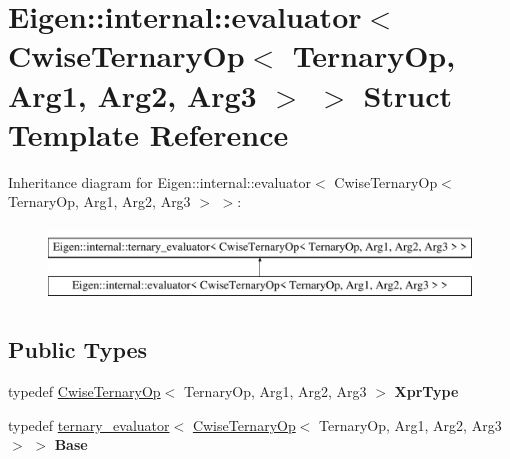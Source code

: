 \hypertarget{struct_eigen_1_1internal_1_1evaluator_3_01_cwise_ternary_op_3_01_ternary_op_00_01_arg1_00_01_arg2_00_01_arg3_01_4_01_4}{}\section{Eigen\+::internal\+::evaluator$<$ Cwise\+Ternary\+Op$<$ Ternary\+Op, Arg1, Arg2, Arg3 $>$ $>$ Struct Template Reference}
\label{struct_eigen_1_1internal_1_1evaluator_3_01_cwise_ternary_op_3_01_ternary_op_00_01_arg1_00_01_arg2_00_01_arg3_01_4_01_4}
Inheritance diagram for Eigen\+::internal\+::evaluator$<$ Cwise\+Ternary\+Op$<$ Ternary\+Op, Arg1, Arg2, Arg3 $>$ $>$\+:\begin{figure}[H]
\begin{center}
\leavevmode
\includegraphics[height=2.000000cm]{struct_eigen_1_1internal_1_1evaluator_3_01_cwise_ternary_op_3_01_ternary_op_00_01_arg1_00_01_arg2_00_01_arg3_01_4_01_4}
\end{center}
\end{figure}
\subsection*{Public Types}
\begin{DoxyCompactItemize}
\item 
\mbox{\label{struct_eigen_1_1internal_1_1evaluator_3_01_cwise_ternary_op_3_01_ternary_op_00_01_arg1_00_01_arg2_00_01_arg3_01_4_01_4_a2408ad4c5a0832abddf5547e39d94c63}} 
typedef \mbox{\hyperlink{class_eigen_1_1_cwise_ternary_op}{Cwise\+Ternary\+Op}}$<$ Ternary\+Op, Arg1, Arg2, Arg3 $>$ {\bfseries Xpr\+Type}
\item 
\mbox{\label{struct_eigen_1_1internal_1_1evaluator_3_01_cwise_ternary_op_3_01_ternary_op_00_01_arg1_00_01_arg2_00_01_arg3_01_4_01_4_adc108f0619a3b127e036bca0ec13ac59}} 
typedef \mbox{\hyperlink{struct_eigen_1_1internal_1_1ternary__evaluator}{ternary\+\_\+evaluator}}$<$ \mbox{\hyperlink{class_eigen_1_1_cwise_ternary_op}{Cwise\+Ternary\+Op}}$<$ Ternary\+Op, Arg1, Arg2, Arg3 $>$ $>$ {\bfseries Base}
\end{DoxyCompactItemize}
